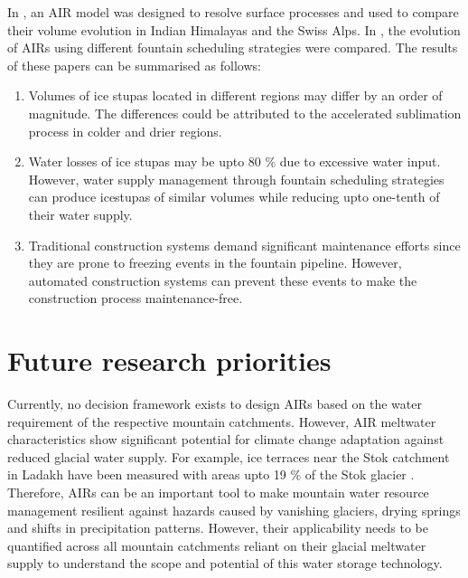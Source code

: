 \documentclass[tc]{copernicus}
\begin{document}
In \citet{balasubramanianInfluenceMeteorologicalConditions2022}, an AIR model was designed to resolve surface
processes and used to compare their volume evolution in Indian Himalayas and the Swiss Alps. In
\citet{balasubramanianFountainSchedulingStrategies2022}, the evolution of AIRs using different fountain
scheduling strategies were compared.  The results of these papers can be summarised as follows:

\begin{enumerate} 

\item Volumes of ice stupas located in different regions may differ by an order of magnitude. The differences
  could be attributed to the accelerated sublimation process in colder and drier regions.

\item Water losses of ice stupas may be upto 80 \% due to excessive water input. However, water supply
  management through fountain scheduling strategies can produce icestupas of similar volumes while reducing upto
  one-tenth of their water supply.

\item Traditional construction systems demand significant maintenance efforts since they are prone to freezing
  events in the fountain pipeline. However, automated construction systems can prevent these events to make the
  construction process maintenance-free.
\end{enumerate}


\section{Future research priorities}

Currently, no decision framework exists to design AIRs based on the water requirement of the respective mountain
catchments. However, AIR meltwater characteristics show significant potential for climate change adaptation
against reduced glacial water supply. For example, ice terraces near the Stok catchment in Ladakh have been
measured with areas upto 19 \% of the Stok glacier \citep{nusserSociohydrologyArtificialGlaciers2019,
sohebMassbalanceObservationReconstruction2020}. Therefore, AIRs can be an important tool to make mountain water
resource management resilient against hazards caused by vanishing glaciers, drying springs and shifts in
precipitation patterns. However, their applicability needs to be quantified across all mountain catchments
reliant on their glacial meltwater supply to understand the scope and potential of this water storage
technology.
\end{document}
